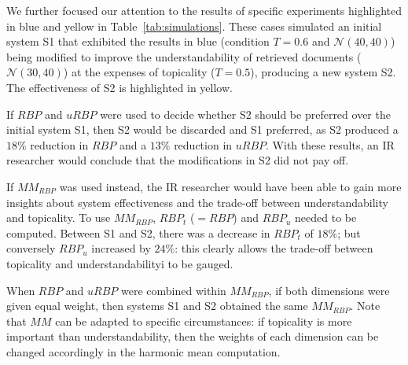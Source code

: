 We further focused our attention to the results of specific experiments highlighted in blue and yellow in Table~\ref{tab:simulations}. These cases simulated an initial system S1 that exhibited the results in blue (condition $T=0.6$ and $\mathcal{N}(40,40)$) being modified to improve the understandability of retrieved documents ($\mathcal{N}(30,40)$) at the expenses of topicality ($T=0.5$), producing a new system S2. The effectiveness of S2 is highlighted in yellow. 

If $RBP$ and $uRBP$ were used to decide whether S2 should be preferred over the initial system S1, then S2 would be discarded and S1 preferred, as S2 produced a $18\%$ reduction in $RBP$ and a $13\%$ reduction in $uRBP$. With these results, an IR researcher would conclude that the modifications in S2 did not pay off.

If $MM_{RBP}$ was used instead, the IR researcher would have been able to gain more insights about system effectiveness and the trade-off between understandability and topicality. To use $MM_{RBP}$, $RBP_t$ ($=RBP$) and $RBP_u$ needed to be computed. Between S1 and S2, there was a decrease in $RBP_t$ of $18\%$; but conversely $RBP_u$ increased by $24\%$: this clearly allows the trade-off between topicality and understandabilityi to be gauged. 

When $RBP$ and $uRBP$ were combined within $MM_{RBP}$, if both dimensions were given equal weight, then systems S1 and S2 obtained the same $MM_{RBP}$. Note that $MM$ can be adapted to specific circumstances: if topicality is more important than understandability, then the weights of each dimension can be changed accordingly in the harmonic mean computation. 


